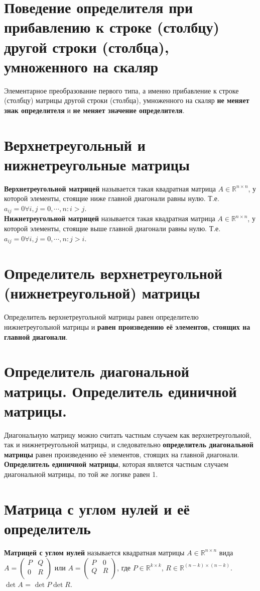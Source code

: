\documentclass[a4paper,11pt]{report}
\begin{document}
\section{Поведение определителя при прибавлению к строке (столбцу) другой строки (столбца), умноженного на скаляр}
Элементарное преобразование первого типа, а именно прибавление к строке (столбцу) матрицы другой строки
(столбца), умноженного на скаляр
\textbf{не меняет знак определителя} и \textbf{не меняет значение определителя}.
\section{Верхнетреугольный и нижнетреугольные матрицы}
\textbf{Верхнетреугольной матрицей} называется такая квадратная матрица $A \in \mathbb{R}^{n\times{n}}$,
у которой элементы, стоящие ниже главной диагонали равны нулю. Т.е. $a_{ij} = 0 \forall i,j = {0, \cdots, n}: i > j$.\\
\textbf{Нижнетреугольной матрицей} называется такая квадратная матрица $A \in \mathbb{R}^{n\times{n}}$,
у которой элементы, стоящие выше главной диагонали равны нулю. Т.е. $a_{ij} = 0 \forall i,j = {0, \cdots, n}: j > i$.\\
\section{Определитель верхнетреугольной (нижнетреугольной) матрицы}
Определитель верхнетреугольной матрицы равен определителю нижнетреугольной матрицы и \textbf{равен
произведению её элементов, стоящих на главной диагонали}.
\section{Определитель диагональной матрицы. Определитель единичной матрицы.}
Диагональную матрицу можно считать частным случаем как верхнетреугольной, так и нижнетреугольной матрицы,
и следовательно \textbf{определитель диагональной матрицы} равен произведению её элементов, стоящих
на главной диагонали.\\
\textbf{Определитель единичной матрицы}, которая является частным случаем диагональной матрицы, по той же логике
равен 1.
\section{Матрица с углом нулей и её определитель}
\textbf{Матрицей с углом нулей} называется квадратная матрицы $A \in \mathbb{R}^{n\times{n}}$ вида
$A = 
\begin{pmatrix}
P & Q\\
0 & R\\
\end{pmatrix}
$ или $A = 
\begin{pmatrix}
P & 0\\
Q & R\\
\end{pmatrix}
$, где $P \in \mathbb{R}^{k\times{k}}$, $R \in \mathbb{R}^{(n-k)\times{(n-k)}}$.\\
\textbf{$\det A$} = $\det P\det R$.\\
\end{document}

